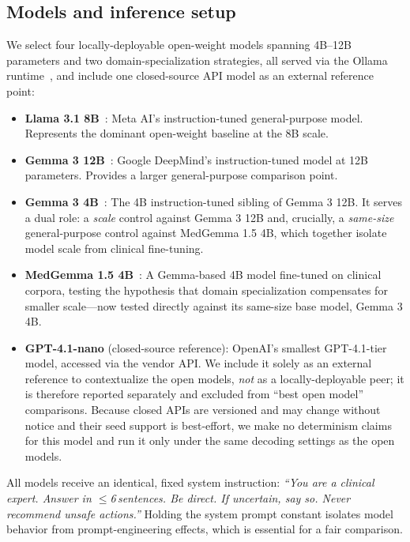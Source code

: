 \documentclass[10pt,letterpaper]{article}
\begin{document}
\subsection*{Models and inference setup}

We select four locally-deployable open-weight models spanning
4B--12B parameters and two domain-specialization strategies, all served
via the Ollama runtime~\cite{ollama}, and include one closed-source API
model as an external reference point:

\begin{itemize}
  \item \textbf{Llama 3.1 8B}~\cite{dubey2024llama3}:
        Meta AI's instruction-tuned general-purpose model.
        Represents the dominant open-weight baseline at the 8B scale.
  \item \textbf{Gemma 3 12B}~\cite{team2024gemma}:
        Google DeepMind's instruction-tuned model at 12B parameters.
        Provides a larger general-purpose comparison point.
  \item \textbf{Gemma 3 4B}~\cite{team2024gemma}:
        The 4B instruction-tuned sibling of Gemma 3 12B. It serves a
        dual role: a \emph{scale} control against Gemma 3 12B and,
        crucially, a \emph{same-size} general-purpose control against
        MedGemma 1.5 4B, which together isolate model scale from
        clinical fine-tuning.
  \item \textbf{MedGemma 1.5 4B}~\cite{medgemma2024}:
        A Gemma-based 4B model fine-tuned on clinical corpora,
        testing the hypothesis that domain specialization compensates
        for smaller scale---now tested directly against its same-size
        base model, Gemma 3 4B.
  \item \textbf{GPT-4.1-nano} (closed-source reference):
        OpenAI's smallest GPT-4.1-tier model, accessed via the vendor
        API. We include it solely as an external reference to contextualize
        the open models, \emph{not} as a locally-deployable peer; it is
        therefore reported separately and excluded from ``best open
        model'' comparisons. Because closed APIs are versioned and may
        change without notice and their seed support is best-effort, we
        make no determinism claims for this model and run it only under
        the same decoding settings as the open models.
\end{itemize}

All models receive an identical, fixed system instruction:
\textit{``You are a clinical expert. Answer in $\leq$6\,sentences.
Be direct. If uncertain, say so. Never recommend unsafe actions.''}
Holding the system prompt constant isolates model behavior from
prompt-engineering effects, which is essential for a fair comparison.
\end{document}
